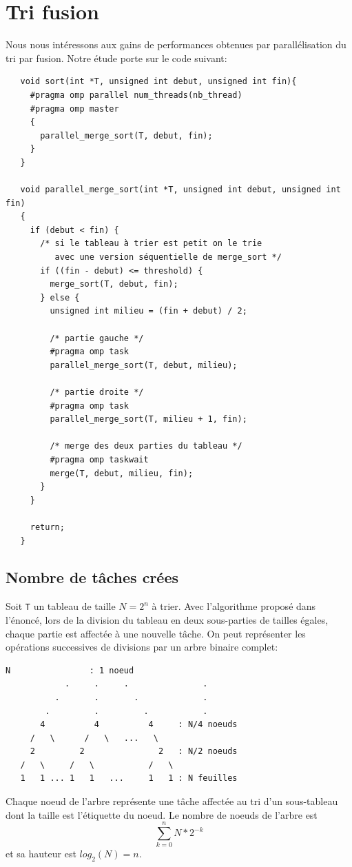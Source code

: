 \documentclass[11pt]{article}
\theoremstyle{definition}
\theoremstyle{definition}
\theoremstyle{definition}
\begin{document}
\section{Tri fusion}
Nous nous intéressons aux gains de performances obtenues par parallélisation du tri par fusion.
Notre étude porte sur le code suivant:
 \begin{verbatim}
   void sort(int *T, unsigned int debut, unsigned int fin){
     #pragma omp parallel num_threads(nb_thread)
     #pragma omp master
     {
       parallel_merge_sort(T, debut, fin);
     }
   }
   
   void parallel_merge_sort(int *T, unsigned int debut, unsigned int fin)
   {
     if (debut < fin) {
       /* si le tableau à trier est petit on le trie
          avec une version séquentielle de merge_sort */
       if ((fin - debut) <= threshold) {
         merge_sort(T, debut, fin);
       } else {
         unsigned int milieu = (fin + debut) / 2;

         /* partie gauche */
         #pragma omp task
         parallel_merge_sort(T, debut, milieu);

         /* partie droite */
         #pragma omp task
         parallel_merge_sort(T, milieu + 1, fin);

         /* merge des deux parties du tableau */
         #pragma omp taskwait
         merge(T, debut, milieu, fin);
       }
     }

     return;
   }
 \end{verbatim}
 \subsection{Nombre de tâches crées}
 Soit \texttt{T} un tableau de taille $N=2^n$ à trier.
 Avec l'algorithme proposé dans l'énoncé, lors de la division du tableau en deux sous-parties de tailles égales,
 chaque partie est affectée à une nouvelle tâche. On peut représenter les opérations successives de divisions
 par un arbre binaire complet:
 \begin{lstlisting}[basicstyle={\scriptsize\ttfamily}, columns={fixed}, frame={}]
                  N                : 1 noeud
            .     .     .               .
          .       .       .             .
        .         .         .           .
       4          4          4     : N/4 noeuds
     /   \      /   \   ...   \
     2         2               2   : N/2 noeuds
   /   \     /   \           /   \
   1   1 ... 1   1   ...     1   1 : N feuilles
 \end{lstlisting}
 Chaque noeud de l'arbre représente une tâche affectée au tri d'un sous-tableau dont la taille est l'étiquette du noeud.
 Le nombre de noeuds de l'arbre est 
 $$ \sum_{k=0}^{n} N * 2^{-k} $$
 et sa hauteur est $log_2(N)=n$.
\end{document}
